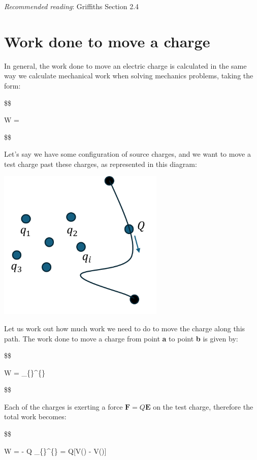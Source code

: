 \documentclass[
  letterpaper,
  DIV=11,
  numbers=noendperiod]{scrreprt}
\begin{document}
\newcommand{\a}{\mathrm{\mathbf{a}}}
\newcommand{\b}{\mathrm{\mathbf{b}}}

\emph{Recommended reading}: Griffiths Section 2.4

\section{Work done to move a charge}\label{work-done-to-move-a-charge}

In general, the work done to move an electric charge is calculated in
the same way we calculate mechanical work when solving mechanics
problems, taking the form:

\$\$

W = \int {} \cdot {}  

\$\$

Let's say we have some configuration of source charges, and we want to
move a test charge past these charges, as represented in this diagram:

\includegraphics[width=3.125in,height=\textheight]{Figures/workdone_charge.png}

Let us work out how much work we need to do to move the charge along
this path. The work done to move a charge from point \textbf{a} to point
\textbf{b} is given by:

\$\$

W = \int\_\{\}\^{}\{\}
 \cdot {}  

\$\$

Each of the charges is exerting a force
\(\mathrm{\mathbf{F}}= Q \mathrm{\mathbf{E}}\) on the test charge,
therefore the total work becomes:

\$\$

W = - Q \int\_\{\}\^{}\{\}
 \cdot {}  =
Q{[}V() - V(){]}
\end{document}
